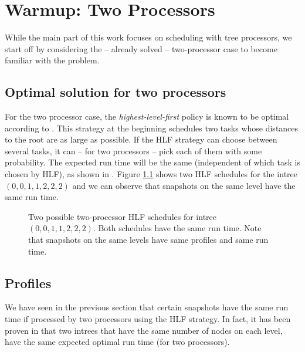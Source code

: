 \chapter{Warmup: Two Processors}
\label{chap:p2}

While the main part of this work focuses on scheduling with tree processors, we start off by considering the -- already solved -- two-processor case to become familiar with the problem. 

\section{Optimal solution for two processors}
\label{sec:p2-hlf-is-optimal}

For the two processor case, the \emph{highest-level-first} policy is known to be optimal according to \cite{chandyreynoldsshortpaper1975}. This strategy at the beginning schedules two tasks whose distances to the root are as large as possible. If the HLF strategy can choose between several tasks, it can -- for two processors -- pick each of them with some probability. The expected run time will be the same (independent of which task is chosen by HLF), as shown in \cite{chandyreynoldsshortpaper1975}. Figure \ref{fig:p2-intro-example} shows two HLF schedules for the intree $(0,0,1,1,2,2,2)$ and we can observe that snapshots on the same level have the same run time.

\begin{figure}[h!]
  \centering
  
    
  \caption{Two possible two-processor HLF schedules for intree $(0,0,1,1,2,2,2)$. Both schedules have the same run time. Note that snapshots on the same levels have same profiles and same run time.}
  \label{fig:p2-intro-example}
\end{figure}

\section{Profiles}
\label{sec:p2-profiles}

We have seen in the previous section that certain snapshots have the same run time if processed by two processors using the HLF strategy. In fact, it has been proven in \cite{chandyreynoldsshortpaper1975} that two intrees that have the same number of nodes on each level, have the same expected optimal run time (for two processors).


